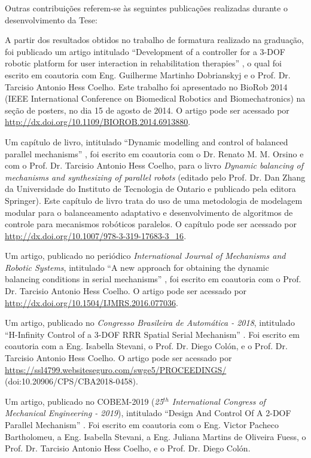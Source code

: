 \documentclass[]{politex}
\begin{document}
Outras contribuições referem-se às seguintes publicações realizadas durante o desenvolvimento da Tese:

A partir dos resultados obtidos no trabalho de formatura realizado na gradua\c{c}\~ao, foi publicado um artigo intitulado ``Development of a controller for a 3-DOF robotic platform for user interaction in rehabilitation therapies'' \cite{Biorob}, o qual foi escrito em coautoria com Eng. Guilherme Martinho Dobrianskyj e o Prof. Dr. Tarcisio Antonio Hess Coelho. Este trabalho foi apresentado no BioRob 2014 (IEEE International Conference on Biomedical Robotics and Biomechatronics) na se\c{c}\~ao de posters, no dia 15 de agosto de 2014. O artigo pode ser acessado por \url{http://dx.doi.org/10.1109/BIOROB.2014.6913880}.

Um cap\' itulo de livro, intitulado ``Dynamic modelling
and control of balanced parallel mechanisms'' \cite{22orsino}, foi escrito em coautoria com o Dr. Renato M. M. Orsino e com o Prof. Dr. Tarcisio Antonio Hess Coelho, para o livro {\em Dynamic balancing of mechanisms and synthesizing of parallel
robots}  (editado pelo Prof. Dr. Dan Zhang da Universidade do Instituto de Tecnologia
de Ontario e publicado pela editora Springer).
Este cap\'itulo de livro trata do uso de uma metodologia de modelagem modular para o
balanceamento adaptativo e desenvolvimento de algoritmos de controle para mecanismos
rob\'oticos paralelos. O capítulo pode ser acessado por \url{http://dx.doi.org/10.1007/978-3-319-17683-3_16}.

Um artigo, publicado no peri\'odico {\em International Journal of Mechanisms and Robotic Systems}, intitulado ``A new approach for obtaining the dynamic balancing conditions in serial mechanisms'' \cite{Coutinho}, foi escrito em coautoria com o Prof. Dr. Tarcisio Antonio Hess Coelho. O artigo pode ser acessado por \url{http://dx.doi.org/10.1504/IJMRS.2016.077036}.

Um artigo, publicado no {\em Congresso Brasileira de Automática - 2018}, intitulado ``H-Infinity Control of a 3-DOF RRR Spatial Serial Mechanism'' \cite{CBA}. Foi escrito em coautoria com a Eng. Isabella Stevani, o Prof. Dr. Diego Colón, e o Prof. Dr. Tarcisio Antonio Hess Coelho. O artigo pode ser acessado por \url{https://ssl4799.websiteseguro.com/swge5/PROCEEDINGS/} (doi:10.20906/CPS/CBA2018-0458).

Um artigo, publicado no COBEM-2019 ({\em 25$^{th}$ International Congress of Mechanical Engineering - 2019}), intitulado ``Design And Control Of A 2-DOF Parallel Mechanism'' \cite{COBEM}. Foi escrito em coautoria com o Eng. Victor Pacheco Bartholomeu, a Eng. Isabella Stevani, a Eng. Juliana Martins de Oliveira Fuess, o Prof. Dr. Tarcisio Antonio Hess Coelho, e o Prof. Dr. Diego Colón.
\end{document}
